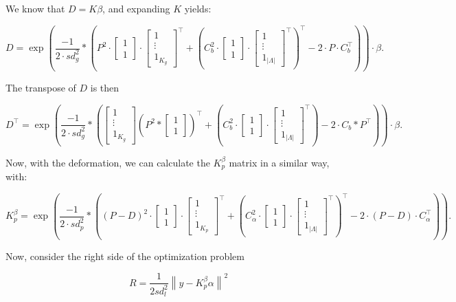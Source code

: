 \documentclass[12pt]{article}
\newcommand{\A}{\alpha}
\newcommand{\B}{\beta}
\newcommand{\longones}[1]{
  \begin{bmatrix}
    1\\
    \vdots\\
    1_{#1}
  \end{bmatrix}
}
\begin{document}
We know that $D = K\beta$, and expanding $K$ yields:

\begin{dmath*}
  D = \exp\left(\frac{-1}{2\cdot sd_g^2} * \left({P^{2}\cdot 
  \begin{bmatrix}
    1\\
    1
  \end{bmatrix} \cdot 
  \longones{K_g}^\top} 
  + {(C_b^{2}\cdot 
  \begin{bmatrix}
    1\\
    1
  \end{bmatrix}
  \cdot 
  \longones{|\Lambda|}
  ^\top )^\top} 
  -2\cdot P\cdot C_b^\top \right)  \right) \cdot \B.
\end{dmath*}

The transpose of $D$ is then


\begin{dmath*}
  D^\top = \exp\left(\frac{-1}{2\cdot sd_g^2} * \left({\longones{K_g}
  \left(P^{2} *  
  \begin{bmatrix}
    1\\
    1
  \end{bmatrix} \right)^\top
  } 
  + {(C_b^{2}\cdot 
  \begin{bmatrix}
    1\\
    1
  \end{bmatrix}
  \cdot 
  \longones{|\Lambda|}
  ^\top )} 
  -2\cdot C_b * P ^\top \right)  \right) \cdot \B.
\end{dmath*}


Now, with the deformation, we can calculate the $K_p^\beta$ matrix in a similar way, with:

\begin{dmath*}
  K_p^\beta = \exp\left(\frac{-1}{2\cdot sd_p^2} * \left({(P-D)^{2}\cdot 
  \begin{bmatrix}
    1\\
    1
  \end{bmatrix} \cdot 
  \longones{K_p}^\top} 
  + {(C_\A^{2}\cdot 
  \begin{bmatrix}
    1\\
    1
  \end{bmatrix}
  \cdot 
  \longones{|\Lambda|}
  ^\top )^\top} 
  -2\cdot (P-D)\cdot C_\A^\top \right)  \right).
\end{dmath*}

Now, consider the right side of the optimization problem

\begin{dmath*}
  R = \frac{1}{2sd_l^2} 
  \left\| 
  y - K_p^\B\A
  \right\|^2
\end{dmath*}
\end{document}

